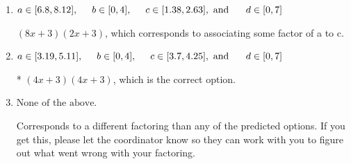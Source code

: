 \documentclass{extbook}[14pt]
\begin{document}
\begin{enumerate}
{\begin{enumerate}[label=\Alph*.]
 $(x + 12)(x + 12)$, which corresponds to factoring $x^{2} +24 x + 144$.
\item \( a \in [6.8, 8.12], \hspace*{5mm} b \in [0, 4], \hspace*{5mm} c \in [1.38, 2.63], \text{ and } \hspace*{5mm} d \in [0, 7] \)

 $(8x + 3)(2x + 3)$, which corresponds to associating some factor of a to c.
\item \( a \in [3.19, 5.11], \hspace*{5mm} b \in [0, 4], \hspace*{5mm} c \in [3.7, 4.25], \text{ and } \hspace*{5mm} d \in [0, 7] \)

* $(4x + 3)(4x + 3)$, which is the correct option.
\item \( \text{None of the above.} \)

 Corresponds to a different factoring than any of the predicted options. If you get this, please let the coordinator know so they can work with you to figure out what went wrong with your factoring.
\end{enumerate}

}
\end{enumerate}
\end{document}
